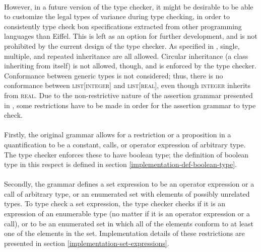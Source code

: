 \paragraph{} However, in a future version of the type checker, it might be desirable to be able to customize the legal types of variance during type checking, in order to consistently type check bon specifications extracted from other programming languages than Eiffel. This is left as an option for further development, and is not prohibited by the current design of the type checker.
As specified in \cite[p.~65]{walden1995}, single, multiple, and repeated inheritance are all allowed. Circular inheritance (a class inheriting from itself) is not allowed, though, and is enforced by the type checker. Conformance between generic types is not considered; thus, there is no conformance between \textsc{list}[\textsc{integer}] and \textsc{list}[\textsc{real}], even though \textsc{integer} inherits from \textsc{real}.
Due to the non-restrictive nature of the assertion grammar presented in \cite{walden1995}, some restrictions have to be made in order for the assertion grammar to type check.
\paragraph{} Firstly, the original grammar allows for a restriction or a proposition in a quantification to be a constant, calls, or operator expression of arbitrary type. The type checker enforces these to have boolean type; the definition of boolean type in this respect is defined in section \ref{implementation-def-boolean-type}.
\paragraph{} Secondly,  the grammar defines a set expression to be an operator expression or a call of arbitrary type, or an enumerated set with elements of possibly unrelated types. To type check a set expression, the type checker checks if it is an expression of an enumerable type (no matter if it is an operator expression or a call), or to be an enumerated set in which all of the elements conform to at least one of the elements in the set. Implementation details of these restrictions are presented in section \ref{implementation-set-expressions}.



